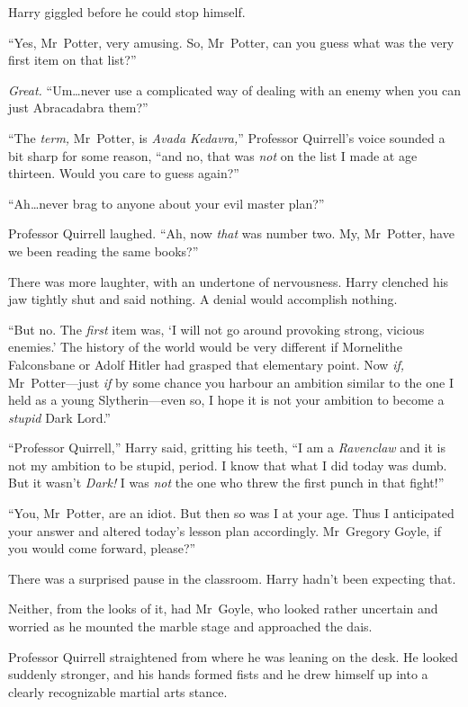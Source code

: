 Harry giggled before he could stop himself.

“Yes, Mr~Potter, very amusing. So, Mr~Potter, can you guess what was the very first item on that list?”

\emph{Great.} “Um…never use a complicated way of dealing with an enemy when you can just Abracadabra them?”

“The \emph{term,} Mr~Potter, is \emph{Avada Kedavra,}” Professor Quirrell’s voice sounded a bit sharp for some reason, “and no, that was \emph{not} on the list I made at age thirteen. Would you care to guess again?”

“Ah…never brag to anyone about your evil master plan?”

Professor Quirrell laughed. “Ah, now \emph{that} was number two. My, Mr~Potter, have we been reading the same books?”

There was more laughter, with an undertone of nervousness. Harry clenched his jaw tightly shut and said nothing. A denial would accomplish nothing.

“But no. The \emph{first} item was, ‘I will not go around provoking strong, vicious enemies.’ The history of the world would be very different if Mornelithe Falconsbane or Adolf Hitler had grasped that elementary point. Now \emph{if,} Mr~Potter—just \emph{if} by some chance you harbour an ambition similar to the one I held as a young Slytherin—even so, I hope it is not your ambition to become a \emph{stupid} Dark Lord.”

“Professor Quirrell,” Harry said, gritting his teeth, “I am a \emph{Ravenclaw} and it is not my ambition to be stupid, period. I know that what I did today was dumb. But it wasn’t \emph{Dark!} I was \emph{not} the one who threw the first punch in that fight!”

“You, Mr~Potter, are an idiot. But then so was I at your age. Thus I anticipated your answer and altered today’s lesson plan accordingly. Mr~Gregory Goyle, if you would come forward, please?”

There was a surprised pause in the classroom. Harry hadn’t been expecting that.

Neither, from the looks of it, had Mr~Goyle, who looked rather uncertain and worried as he mounted the marble stage and approached the dais.

Professor Quirrell straightened from where he was leaning on the desk. He looked suddenly stronger, and his hands formed fists and he drew himself up into a clearly recognizable martial arts stance.

